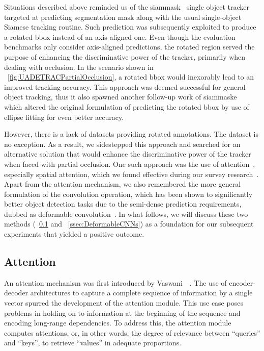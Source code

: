Situations described above reminded us of the \gls{siammask}~\cite{wang2019siammask} single object tracker targeted at predicting segmentation mask along with the usual single-object Siamese tracking routine. Such prediction was subsequently exploited to produce a rotated \gls{bbox} instead of an axis-aligned one. Even though the evaluation benchmarks only consider axis-aligned predictions, the rotated region served the purpose of enhancing the discriminative power of the tracker, primarily when dealing with occlusion. In the scenario shown in \figtext{}~\ref{fig:UADETRACPartialOcclusion}, a rotated \gls{bbox} would inexorably lead to an improved tracking accuracy. This approach was deemed successful for general object tracking, thus it also spawned another follow-up work of \gls{siammaske}~\cite{chen2019rotbboxes} which altered the original formulation of predicting the rotated \gls{bbox} by use of ellipse fitting for even better accuracy.

However, there is a lack of datasets providing rotated annotations. The \uadetrac{} dataset is no exception. As a result, we sidestepped this approach and searched for an alternative solution that would enhance the discriminative power of the tracker when faced with partial occlusion. One such approach was the use of attention~\cite{vaswani2017attention}, especially spatial attention, which we found effective during our survey research~\cite{ondrasovic2021siamese}. Apart from the attention mechanism, we also remembered the more general formulation of the convolution operation, which has been shown to significantly better object detection tasks due to the semi-dense prediction requirements, dubbed as deformable convolution~\cite{dai2017dcnn}. In what follows, we will discuss these two methods (\sectiontext{}~\ref{ssec:Attention} and \sectiontext{}~\ref{ssec:DeformableCNNs}) as a foundation for our subsequent experiments that yielded a positive outcome.

\subsection{Attention}
\label{ssec:Attention}

An attention mechanism was first introduced by Vaswani~\etal{}~\cite{vaswani2017attention}. The use of encoder-decoder architectures to capture a complete sequence of information by a single vector spurred the development of the attention module. This use case poses problems in holding on to information at the beginning of the sequence and encoding long-range dependencies. To address this, the attention module computes attentions, or, in other words, the degree of relevance between ``queries'' and ``keys'', to retrieve ``values'' in adequate proportions.

